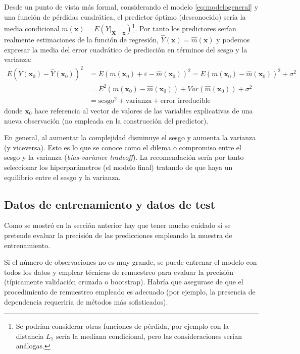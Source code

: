 \documentclass[]{book}
\theoremstyle{break}
\theoremstyle{definition}
\theoremstyle{definition}
\theoremstyle{definition}
\theoremstyle{remark}
\begin{document}
Desde un punto de vista más formal, considerando el modelo
\eqref{eq:modelogeneral} y una función de pérdidas cuadrática, el
predictor óptimo (desconocido) sería la media condicional
\(m(\mathbf{x}) = E\left( \left. Y\right\vert_{\mathbf{X}=\mathbf{x}} \right)\)\footnote{Se
  podrían considerar otras funciones de pérdida, por ejemplo con la
  distancia \(L_1\) sería la mediana condicional, pero las
  consideraciones serían análogas.}. Por tanto los predictores serían
realmente estimaciones de la función de regresión,
\(\hat Y(\mathbf{x}) = \hat m(\mathbf{x})\) y podemos expresar la media
del error cuadrático de predicción en términos del sesgo y la varianza:
\[
\begin{aligned}
E \left( Y(\mathbf{x}_0) - \hat Y(\mathbf{x}_0) \right)^2 & = E \left( m(\mathbf{x}_0) + \varepsilon - \hat m(\mathbf{x}_0) \right)^2 = E \left( m(\mathbf{x}_0) - \hat m(\mathbf{x}_0) \right)^2 + \sigma^2 \\
& = E^2 \left( m(\mathbf{x}_0) - \hat m(\mathbf{x}_0) \right) + Var\left( \hat m(\mathbf{x}_0) \right) + \sigma^2 \\
& = \text{sesgo}^2 + \text{varianza} + \text{error irreducible}
\end{aligned}
\] donde \(\mathbf{x}_0\) hace referencia al vector de valores de las
variables explicativas de una nueva observación (no empleada en la
construcción del predictor).

En general, al aumentar la complejidad disminuye el sesgo y aumenta la
varianza (y viceversa). Esto es lo que se conoce como el dilema o
compromiso entre el sesgo y la varianza (\emph{bias-variance tradeoff}).
La recomendación sería por tanto seleccionar los hiperparámetros (el
modelo final) tratando de que haya un equilibrio entre el sesgo y la
varianza.

\subsection{Datos de entrenamiento y datos de
test}\label{entrenamiento-test}

Como se mostró en la sección anterior hay que tener mucho cuidado si se
pretende evaluar la precisión de las predicciones empleando la muestra
de entrenamiento.

Si el número de observaciones no es muy grande, se puede entrenar el
modelo con todos los datos y emplear técnicas de remuestreo para evaluar
la precisión (típicamente validación cruzada o bootstrap). Habría que
asegurase de que el procedimiento de remuestreo empleado es adecuado
(por ejemplo, la presencia de dependencia requeriría de métodos más
sofisticados).
\end{document}
